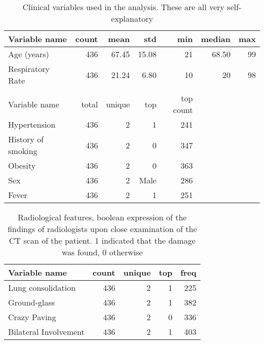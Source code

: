 \begin{table}[htbp]
\caption{Clinical variables used in the analysis. These are all very self-explanatory \label{tab:ClinicalFeatures}}
\centering
\begin{tabular}{lrrrrrr}
\toprule
Variable name &  count &       mean &        std &   min &   median &   max \\
\midrule
Age (years)        &  436 &  67.45 &  15.08 &  21 &  68.50 &  99 \\
Respiratory Rate   &  436 &  21.24 &   6.80 &  10 &  20 &  98 \\
\hline
&&&&&&\\
Variable name &  total &  unique &  top &  top count & & \\ 
\hline
Hypertension       &    436 &       2 &    1 &   241 \\
History of smoking &    436 &       2 &    0 &   347 \\
Obesity            &    436 &       2 &    0 &   363 \\
Sex            &    436 &       2 &    Male &   286 \\
Fever             &    436 &       2 &    1 &   251 \\
\bottomrule
\end{tabular}
\end{table}


\begin{table}[htbp]
\caption{Radiological features, boolean expression of the findings of radiologists upon close examination of the CT scan of the patient. 1 indicated that the damage was found, 0 otherwise \label{tab:RadiologicalFeatures}}
\centering
\begin{tabular}{lrrrr}
\toprule
Variable name &  count &  unique &  top &  freq \\
\midrule
Lung consolidation    &    436 &       2 &    1 &   225 \\
Ground-glass          &    436 &       2 &    1 &   382 \\
Crazy Paving          &    436 &       2 &    0 &   336 \\
Bilateral Involvement &    436 &       2 &    1 &   403 \\
\bottomrule
\end{tabular}
\end{table}

